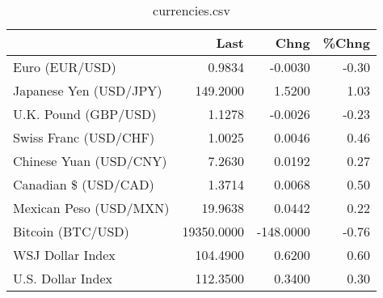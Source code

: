 \documentclass{article}%
\begin{document}
%


\begin{table}[htbp]%
\caption{currencies.csv}%
\centering%
\begin{adjustbox}{width=1\textwidth}%
\begin{tabular}{lrrr}
\toprule
                       &       Last &      Chng &  \%Chng \\
\midrule
        Euro (EUR/USD) &     0.9834 &   -0.0030 &  -0.30 \\
Japanese Yen (USD/JPY) &   149.2000 &    1.5200 &   1.03 \\
  U.K. Pound (GBP/USD) &     1.1278 &   -0.0026 &  -0.23 \\
 Swiss Franc (USD/CHF) &     1.0025 &    0.0046 &   0.46 \\
Chinese Yuan (USD/CNY) &     7.2630 &    0.0192 &   0.27 \\
  Canadian \$ (USD/CAD) &     1.3714 &    0.0068 &   0.50 \\
Mexican Peso (USD/MXN) &    19.9638 &    0.0442 &   0.22 \\
     Bitcoin (BTC/USD) & 19350.0000 & -148.0000 &  -0.76 \\
      WSJ Dollar Index &   104.4900 &    0.6200 &   0.60 \\
     U.S. Dollar Index &   112.3500 &    0.3400 &   0.30 \\
\bottomrule
\end{tabular}
%
\end{adjustbox}%
\end{table}

%
\end{document}
